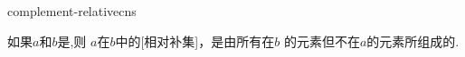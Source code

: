 \begin{modnl}[creators=hang]{complement-relative}{cns}
	\begin{definition}[id=complement-relative.def]
	如果$a$和$b$是,则  
	$a$在$b$中的[相对补集]，是由所有在$b$
	的元素但不在$a$的元素所组成的.
	\end{definition}
\end{modnl}
